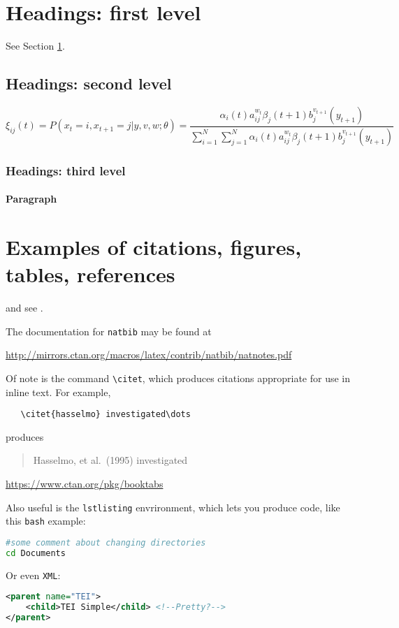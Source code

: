 \begin{paper}
\section{Headings: first level}
\label{sec:headings}

\lipsum[4] See Section \ref{sec:headings}.

\subsection{Headings: second level}
\lipsum[5]
\begin{equation}
\xi _{ij}(t)=P(x_{t}=i,x_{t+1}=j|y,v,w;\theta)= {\frac {\alpha _{i}(t)a^{w_t}_{ij}\beta _{j}(t+1)b^{v_{t+1}}_{j}(y_{t+1})}{\sum _{i=1}^{N} \sum _{j=1}^{N} \alpha _{i}(t)a^{w_t}_{ij}\beta _{j}(t+1)b^{v_{t+1}}_{j}(y_{t+1})}}
\end{equation}

\subsubsection{Headings: third level}
\lipsum[6]

\paragraph{Paragraph}
\lipsum[7]

\section*{Examples of citations, figures, tables, references}
\label{sec:others}
\lipsum[8] \citep{wiki:xxx} and see \cite{wiki:xxx}.

The documentation for \verb+natbib+ may be found at
\begin{center}
  \url{http://mirrors.ctan.org/macros/latex/contrib/natbib/natnotes.pdf}
\end{center}
Of note is the command \verb+\citet+, which produces citations
appropriate for use in inline text.  For example,
\begin{verbatim}
   \citet{hasselmo} investigated\dots
\end{verbatim}
produces
\begin{quote}
  Hasselmo, et al.\ (1995) investigated
\end{quote}

\begin{center}
  \url{https://www.ctan.org/pkg/booktabs}
\end{center}
Also useful is the \verb+lstlisting+ envrironment, which lets you produce code, like this \verb+bash+ example:
\begin{lstlisting}[language=bash]
#some comment about changing directories
cd Documents
\end{lstlisting}
Or even \verb+XML+:
\begin{lstlisting}[language=XML]
<parent name="TEI">
    <child>TEI Simple</child> <!--Pretty?-->
</parent>



\end{lstlisting}
\end{paper}
